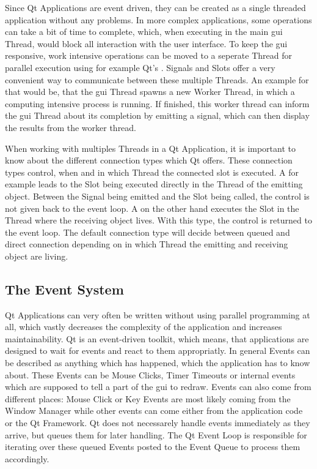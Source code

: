 Since Qt Applications are event driven, they can be created as a single threaded
application without any problems. In more complex applications, some operations
can take a bit of time to complete, which, when executing in the main \gls{gui}
Thread, would block all interaction with the user interface. To keep the
\gls{gui} responsive, work intensive operations can be moved to a seperate
Thread for parallel execution using for example Qt's
. Signals and Slots offer a very convenient
way to communicate between these multiple Threads. An example for that would be,
that the \gls{gui} Thread spawns a new Worker Thread, in which a computing
intensive process is running. If finished, this worker thread can inform the
\gls{gui} Thread about its completion by emitting a signal, which can then
display the results from the worker thread.

When working with multiples Threads in a Qt Application, it is important to know
about the different connection types which Qt offers. These connection types
control, when and in which Thread the connected slot is executed. A
 for example leads to the Slot
being executed directly in the Thread of the emitting object. Between the Signal
being emitted and the Slot being called, the control is not given back to the
event loop. A  on the other hand
executes the Slot in the Thread where the receiving object lives. With this
type, the control is returned to the event loop. The default connection type
 will decide between queued and
direct connection depending on in which Thread the emitting and receiving object
are living.

\cite{QtConnectionTypes}





\subsection{The Event System}
\label{sec:fundamentals:qt:eventloop}

Qt Applications can very often be written without using parallel programming at
all, which vastly decreases the complexity of the application and increases
maintainability. Qt is an event-driven toolkit, which means, that applications
are designed to wait for events and react to them appropriatly. In general
Events can be described as anything which has happened, which the application
has to know about.  These Events can be Mouse Clicks, Timer Timeouts or internal
events which are supposed to tell a part of the \gls{gui} to redraw. Events can
also come from different places: Mouse Click or Key Events are most likely
coming from the Window Manager while other events can come either from the
application code or the Qt Framework.
Qt does not necessarely handle events immediately as they arrive, but queues
them for later handling. The Qt Event Loop is responsible for iterating over
these queued Events posted to the Event Queue to process them accordingly.

